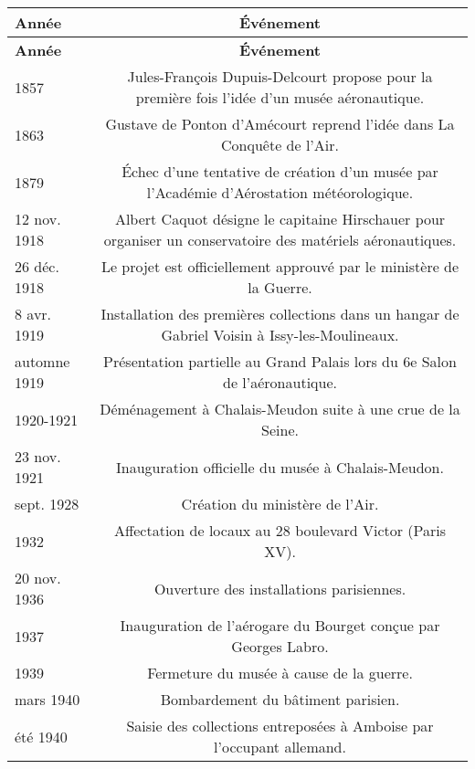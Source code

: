 \begin{longtable}{B C}
	\hline\hline
	\textbf{Année} & \textbf{Événement} \\
	\hline
	\endfirsthead
	
	\hline\hline
	\textbf{Année} & \textbf{Événement} \\
	\hline
	\endhead
	
	\hline
	\endfoot
	
	\hline\hline
	\endlastfoot
	
	
	1857 & Jules-François Dupuis-Delcourt propose pour la première fois l'idée d'un musée aéronautique. \\
	1863 & Gustave de Ponton d'Amécourt reprend l'idée dans La Conquête de l'Air. \\
	1879 & Échec d'une tentative de création d'un musée par l'Académie d'Aérostation météorologique. \\
	
	12 nov. 1918 & Albert Caquot désigne le capitaine Hirschauer pour organiser un conservatoire des matériels aéronautiques.\\
	 26 déc. 1918 & Le projet est officiellement approuvé par le ministère de la Guerre. \\
	 8 avr. 1919 & Installation des premières collections dans un hangar de Gabriel Voisin à Issy-les-Moulineaux. \\
	 automne 1919 & Présentation partielle au Grand Palais lors du 6e Salon de l'aéronautique. \\
	 1920-1921 & Déménagement à Chalais-Meudon suite à une crue de la Seine. \\
	 23 nov. 1921 & Inauguration officielle du musée à Chalais-Meudon. \\
	
	sept. 1928 & Création du ministère de l'Air. \\
	1932 & Affectation de locaux au 28 boulevard Victor (Paris XV). \\
	20 nov. 1936 & Ouverture des installations parisiennes. \\
	1937 & Inauguration de l'aérogare du Bourget conçue par Georges Labro. \\
	1939 & Fermeture du musée à cause de la guerre. \\
	mars 1940 & Bombardement du bâtiment parisien. \\
	été 1940 & Saisie des collections entreposées à Amboise par l'occupant allemand. \\
	

\end{longtable}
